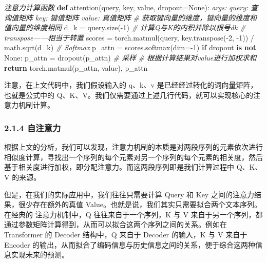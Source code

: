 \documentclass[
]{article}
\newenvironment{Shaded}{}{}
\newcommand{\CommentTok}[1]{\textcolor[rgb]{0.38,0.63,0.69}{\textit{#1}}}
\newcommand{\ControlFlowTok}[1]{\textcolor[rgb]{0.00,0.44,0.13}{\textbf{#1}}}
\newcommand{\DecValTok}[1]{\textcolor[rgb]{0.25,0.63,0.44}{#1}}
\newcommand{\KeywordTok}[1]{\textcolor[rgb]{0.00,0.44,0.13}{\textbf{#1}}}
\newcommand{\NormalTok}[1]{#1}
\newcommand{\OperatorTok}[1]{\textcolor[rgb]{0.40,0.40,0.40}{#1}}
\newcommand{\VariableTok}[1]{\textcolor[rgb]{0.10,0.09,0.49}{#1}}
\begin{document}
\begin{Shaded}
\begin{Highlighting}[]
\CommentTok{\textquotesingle{}\textquotesingle{}\textquotesingle{}注意力计算函数\textquotesingle{}\textquotesingle{}\textquotesingle{}}
\KeywordTok{def}\NormalTok{ attention(query, key, value, dropout}\OperatorTok{=}\VariableTok{None}\NormalTok{):}
    \CommentTok{\textquotesingle{}\textquotesingle{}\textquotesingle{}}
\CommentTok{    args:}
\CommentTok{    query: 查询值矩阵}
\CommentTok{    key: 键值矩阵}
\CommentTok{    value: 真值矩阵}
\CommentTok{    \textquotesingle{}\textquotesingle{}\textquotesingle{}}
    \CommentTok{\# 获取键向量的维度，键向量的维度和值向量的维度相同}
\NormalTok{    d\_k }\OperatorTok{=}\NormalTok{ query.size(}\OperatorTok{{-}}\DecValTok{1}\NormalTok{) }
    \CommentTok{\# 计算Q与K的内积并除以根号dk}
    \CommentTok{\# transpose——相当于转置}
\NormalTok{    scores }\OperatorTok{=}\NormalTok{ torch.matmul(query, key.transpose(}\OperatorTok{{-}}\DecValTok{2}\NormalTok{, }\OperatorTok{{-}}\DecValTok{1}\NormalTok{)) }\OperatorTok{/}\NormalTok{ math.sqrt(d\_k)}
    \CommentTok{\# Softmax}
\NormalTok{    p\_attn }\OperatorTok{=}\NormalTok{ scores.softmax(dim}\OperatorTok{={-}}\DecValTok{1}\NormalTok{)}
    \ControlFlowTok{if}\NormalTok{ dropout }\KeywordTok{is} \KeywordTok{not} \VariableTok{None}\NormalTok{:}
\NormalTok{        p\_attn }\OperatorTok{=}\NormalTok{ dropout(p\_attn)}
        \CommentTok{\# 采样}
     \CommentTok{\# 根据计算结果对value进行加权求和}
    \ControlFlowTok{return}\NormalTok{ torch.matmul(p\_attn, value), p\_attn}
\end{Highlighting}
\end{Shaded}

注意，在上文代码中，我们假设输入的 q、k、v
是已经经过转化的词向量矩阵，也就是公式中的
Q、K、V。我们仅需要通过上述几行代码，就可以实现核心的注意力机制计算。

\subsubsection{2.1.4 自注意力}\label{ux81eaux6ce8ux610fux529b}

根据上文的分析，我们可以发现，注意力机制的本质是对两段序列的元素依次进行相似度计算，寻找出一个序列的每个元素对另一个序列的每个元素的相关度，然后基于相关度进行加权，即分配注意力。而这两段序列即是我们计算过程中
Q、K、V 的来源。

但是，在我们的实际应用中，我们往往只需要计算 Query 和 Key
之间的注意力结果，很少存在额外的真值
Value。也就是说，我们其实只需要拟合两个文本序列。\hspace{0pt}在经典的
注意力机制中，Q 往往来自于一个序列，K 与 V
来自于另一个序列，都通过参数矩阵计算得到，从而可以拟合这两个序列之间的关系。例如在
Transformer 的 Decoder 结构中，Q 来自于 Decoder 的输入，K 与 V 来自于
Encoder
的输出，从而拟合了编码信息与历史信息之间的关系，便于综合这两种信息实现未来的预测。
\end{document}
